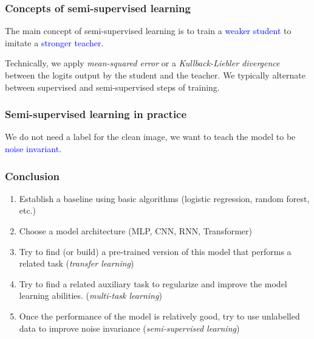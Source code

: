 \documentclass[10pt]{beamer}
\begin{document}
\begin{frame}

  \frametitle{Concepts of semi-supervised learning}

  The main concept of semi-supervised learning is to train a
  \textcolor{blue}{weaker student} to imitate a
  \textcolor{blue}{stronger teacher}.

  \bigskip

  Technically, we apply \emph{mean-squared error} or a
  \emph{Kullback-Liebler divergence} between the logits output by the
  student and the teacher. We typically alternate between supervised
  and semi-supervised steps of training.

\end{frame}

\begin{frame}
  \frametitle{Semi-supervised learning in practice}

  \begin{center}
    
  \end{center}

  \bigskip

  We do not need a label for the clean image, we want to teach the
  model to be \textcolor{blue}{noise invariant}.

\end{frame}

\begin{frame}
  \frametitle{Conclusion}

  \begin{enumerate}
    \item Establish a baseline using basic algorithms (logistic
      regression, random forest, etc.)
    \item Choose a model architecture (MLP, CNN, RNN, Transformer)
    \item Try to find (or build) a pre-trained version of this model
      that performs a related task (\emph{transfer learning})
    \item Try to find a related auxiliary task to regularize and
      improve the model learning abilities. (\emph{multi-task
        learning})
    \item Once the performance of the model is relatively good, try to
      use unlabelled data to improve noise invariance
      (\emph{semi-supervised learning})
  \end{enumerate}
\end{frame}
\end{document}
